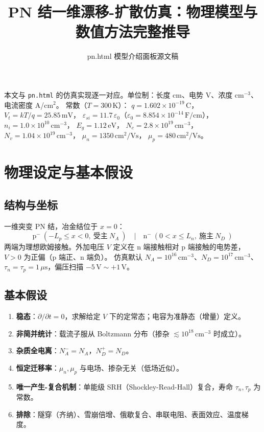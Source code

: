 \documentclass[11pt]{ctexart}
\title{PN 结一维漂移-扩散仿真：物理模型与数值方法完整推导}
\author{pn.html 模型介绍面板源文稿}
\date{}
\begin{document}
\maketitle

\noindent 本文与 \texttt{pn.html} 的仿真实现逐一对应。单位制：长度 cm、电势 V、浓度 cm$^{-3}$、电流密度 A/cm$^2$。
常数（$T=300\,\mathrm{K}$）：
\(q=1.602\times10^{-19}\,\mathrm{C}\)，
\(V_t=kT/q=25.85\,\mathrm{mV}\)，
\(\varepsilon_{si}=11.7\,\varepsilon_0\)（$\varepsilon_0=8.854\times10^{-14}\,\mathrm{F/cm}$），
\(n_i=1.0\times10^{10}\,\mathrm{cm^{-3}}\)，
\(E_g=1.12\,\mathrm{eV}\)，
\(N_c=2.8\times10^{19}\,\mathrm{cm^{-3}}\)，
\(N_v=1.04\times10^{19}\,\mathrm{cm^{-3}}\)，
\(\mu_n=1350\,\mathrm{cm^2/Vs}\)，
\(\mu_p=480\,\mathrm{cm^2/Vs}\)。

\section{物理设定与基本假设}

\subsection{结构与坐标}
一维突变 PN 结，冶金结位于 $x=0$：
\[\mathrm{p}^-\ ( -L_p\le x<0,\ \text{受主}\ N_A\ )\quad\Big|\quad \mathrm{n}^-\ ( 0<x\le L_n,\ \text{施主}\ N_D\ )\]
两端为理想欧姆接触。外加电压 $V$ 定义在 n 端接触相对 p 端接触的电势差，$V>0$ 为正偏（p 端正、n 端负）。
仿真默认 $N_A=10^{16}\,\mathrm{cm^{-3}}$、$N_D=10^{17}\,\mathrm{cm^{-3}}$、$\tau_n=\tau_p=1\,\mu\mathrm{s}$，偏压扫描 $-5\,\mathrm{V}\sim+1\,\mathrm{V}$。

\subsection{基本假设}
\begin{enumerate}
\item \textbf{稳态}：$\partial/\partial t=0$，求解给定 $V$ 下的定常态；电容为准静态（增量）定义。
\item \textbf{非简并统计}：载流子服从 Boltzmann 分布（掺杂 $\lesssim 10^{18}\,\mathrm{cm^{-3}}$ 时成立）。
\item \textbf{杂质全电离}：$N_A^- = N_A$，$N_D^+ = N_D$。
\item \textbf{恒定迁移率}：$\mu_n,\mu_p$ 与电场、掺杂无关（低场近似）。
\item \textbf{唯一产生-复合机制}：单能级 SRH（Shockley-Read-Hall）复合，寿命 $\tau_n,\tau_p$ 为常数。
\item \textbf{排除}：隧穿（齐纳）、雪崩倍增、俄歇复合、串联电阻、表面效应、温度梯度。
\end{enumerate}
\end{document}
